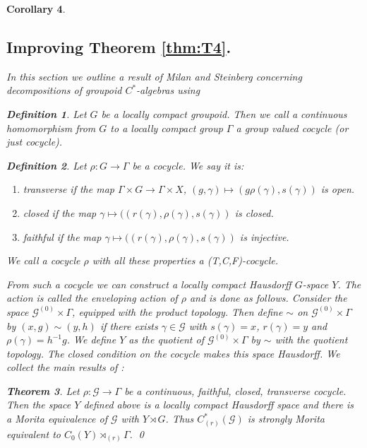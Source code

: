 \documentclass[11pt]{amsart}
\theoremstyle{plain}
\newtheorem{theorem}{Theorem}%
\newtheorem{corollary}[theorem]{Corollary}%
\theoremstyle{definition}%
\newtheorem{definition}[theorem]{Definition}%
\theoremstyle{remark}%
\newcommand{\G}{\mathcal{G}}
\begin{document}
\begin{corollary}
\subsection{Improving Theorem \ref{thm:T4}.}
In this section we outline a result of Milan and Steinberg \cite{} concerning decompositions of groupoid $C^{*}$-algebras using 

\begin{definition}
Let $G$ be a locally compact groupoid. Then we call a continuous homomorphism from $G$ to a locally compact group $\Gamma$ a group valued cocycle (or just cocycle).
\end{definition}

\begin{definition}
Let $\rho: G \rightarrow \Gamma$ be a cocycle. We say it is:
\begin{enumerate}
\item \textit{transverse} if the map $\Gamma \times G \rightarrow \Gamma \times X$, $(g, \gamma) \mapsto (g\rho(\gamma),s(\gamma))$ is open.
\item \textit{closed} if the map $\gamma \mapsto ((r(\gamma),\rho(\gamma),s(\gamma))$ is closed.
\item \textit{faithful} if the map $\gamma \mapsto ((r(\gamma),\rho(\gamma),s(\gamma))$ is injective.
\end{enumerate}
We call a cocycle $\rho$ with all these properties a \textit{(T,C,F)-cocycle}.
\end{definition}

From such a cocycle we can construct a locally compact Hausdorff $G$-space $Y$. The action is called the enveloping action of $\rho$ and is done as follows. Consider the space $\G^{(0)}\times \Gamma$, equipped with the product topology. Then define $\sim$ on $\G^{(0)}\times \Gamma$ by $(x,g)\sim (y,h)$ if there exists $\gamma \in \G$ with $s(\gamma)=x$, $r(\gamma)=y$ and $\rho(\gamma)=h^{-1}g$. We define $Y$ as the quotient of $\G^{(0)}\times \Gamma$ by $\sim$ with the quotient topology. The closed condition on the cocycle makes this space Hausdorff. We collect the main results of \cite{MR1900993}:

\begin{theorem}\label{Thm:1.8}
Let $\rho: \G \rightarrow \Gamma$ be a continuous, faithful, closed, transverse cocycle. Then the space $Y$ defined above is a locally compact Hausdorff space and there is a Morita equivalence of $\G$ with $Y\rtimes G$. Thus $C^{*}_{(r)}(\G)$ is strongly Morita equivalent to $C_{0}(Y)\rtimes_{(r)}\Gamma$. \qed
\end{theorem}


\end{corollary}
\end{document}
